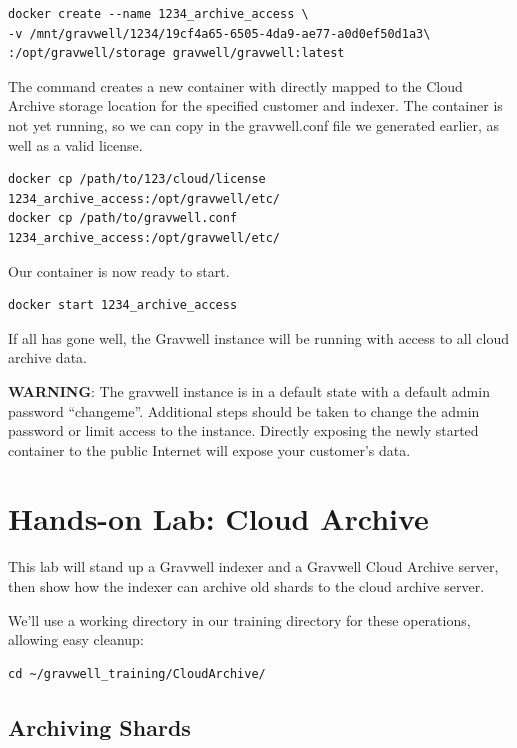 \begin{Verbatim}[breaklines=true]
docker create --name 1234_archive_access \
-v /mnt/gravwell/1234/19cf4a65-6505-4da9-ae77-a0d0ef50d1a3\
:/opt/gravwell/storage gravwell/gravwell:latest
\end{Verbatim}

The command creates a new container with
 directly mapped to the Cloud Archive storage
location for the specified customer and indexer. The container is not
yet running, so we can copy in the gravwell.conf file we generated
earlier, as well as a valid license.

\begin{Verbatim}[breaklines=true]
docker cp /path/to/123/cloud/license 1234_archive_access:/opt/gravwell/etc/
docker cp /path/to/gravwell.conf 1234_archive_access:/opt/gravwell/etc/
\end{Verbatim}


Our container is now ready to start.

\begin{Verbatim}[breaklines=true]
docker start 1234_archive_access
\end{Verbatim}

If all has gone well, the Gravwell instance will be running with access
to all cloud archive data.

\textbf{WARNING}: The gravwell instance is in a default state with a default
admin password ``changeme''. Additional steps should be taken to
change the admin password or limit access to the instance. Directly
exposing the newly started container to the public Internet will expose
your customer's data.

\section{Hands-on Lab: Cloud Archive}

This lab will stand up a Gravwell indexer and a Gravwell Cloud Archive
server, then show how the indexer can archive old shards to the cloud
archive server.

We'll use a working directory in our training directory for these
operations, allowing easy cleanup:

\begin{Verbatim}[breaklines=true]
cd ~/gravwell_training/CloudArchive/
\end{Verbatim}

\subsection{Archiving Shards}

